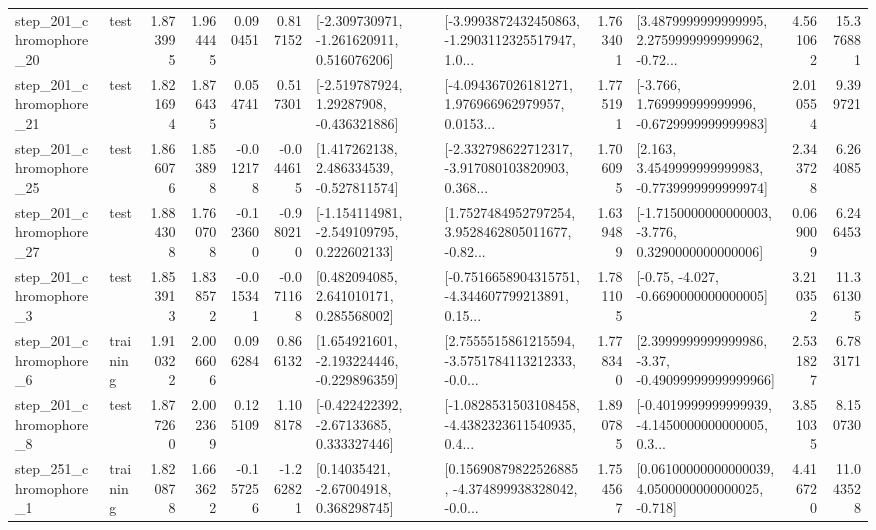 \begin{tabular}{llrrrrllrlrr}
  step\_201\_chromophore\_20 &      test &      1.873995 &    1.964445 &      0.090451 &  0.817152 &   [-2.309730971, -1.261620911, 0.516076206] &  [-3.9993872432450863, -1.2903112325517947, 1.0... &       1.763401 &  [3.4879999999999995, 2.2759999999999962, -0.72... &            4.561062 &         15.376881 \\
  step\_201\_chromophore\_21 &      test &      1.821694 &    1.876435 &      0.054741 &  0.517301 &    [-2.519787924, 1.29287908, -0.436321886] &  [-4.094367026181271, 1.976966962979957, 0.0153... &       1.775191 &   [-3.766, 1.769999999999996, -0.6729999999999983] &            2.010554 &          9.399721 \\
  step\_201\_chromophore\_25 &      test &      1.866076 &    1.853898 &     -0.012178 & -0.044615 &    [1.417262138, 2.486334539, -0.527811574] &  [-2.332798622712317, -3.917080103820903, 0.368... &       1.706095 &   [2.163, 3.4549999999999983, -0.7739999999999974] &            2.343728 &          6.264085 \\
  step\_201\_chromophore\_27 &      test &      1.884308 &    1.760708 &     -0.123600 & -0.980210 &   [-1.154114981, -2.549109795, 0.222602133] &  [1.7527484952797254, 3.9528462805011677, -0.82... &       1.639489 &  [-1.7150000000000003, -3.776, 0.3290000000000006] &            0.069009 &          6.246453 \\
   step\_201\_chromophore\_3 &      test &      1.853913 &    1.838572 &     -0.015341 & -0.071168 &     [0.482094085, 2.641010171, 0.285568002] &  [-0.7516658904315751, -4.344607799213891, 0.15... &       1.781105 &               [-0.75, -4.027, -0.6690000000000005] &            3.210352 &         11.361305 \\
   step\_201\_chromophore\_6 &  training &      1.910322 &    2.006606 &      0.096284 &  0.866132 &   [1.654921601, -2.193224446, -0.229896359] &  [2.7555515861215594, -3.5751784113212333, -0.0... &       1.778340 &  [2.3999999999999986, -3.37, -0.49099999999999966] &            2.531827 &          6.783171 \\
   step\_201\_chromophore\_8 &      test &      1.877260 &    2.002369 &      0.125109 &  1.108178 &    [-0.422422392, -2.67133685, 0.333327446] &  [-1.0828531503108458, -4.4382323611540935, 0.4... &       1.890785 &  [-0.4019999999999939, -4.1450000000000005, 0.3... &            3.851035 &          8.150730 \\
   step\_251\_chromophore\_1 &  training &      1.820878 &    1.663622 &     -0.157256 & -1.262821 &      [0.14035421, -2.67004918, 0.368298745] &  [0.15690879822526885, -4.374899938328042, -0.0... &       1.754567 &  [0.06100000000000039, 4.0500000000000025, -0.718] &            4.416720 &         11.043528 \\

\end{tabular}
